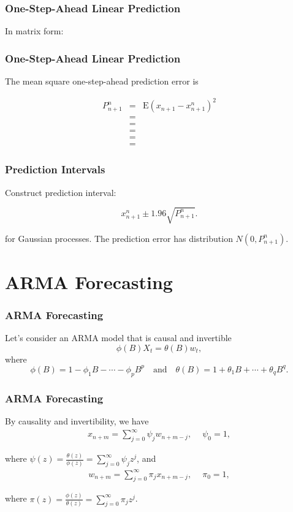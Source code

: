 \documentclass[%
xcolor=pdftex]{beamer}
\begin{document}
\begin{frame}
\frametitle{One-Step-Ahead Linear Prediction}

In matrix form:

\vspace{70mm}

\end{frame}


\begin{frame}
\frametitle{One-Step-Ahead Linear Prediction}

The mean square one-step-ahead prediction error is

\begin{eqnarray}
P_{n+1}^n &=& \mbox{E}(x_{n+1} - x_{n+1}^n)^2 \nonumber \\
          &=& \nonumber \\
          &=& \nonumber \\
          &=& \nonumber \\
          &=& \nonumber \\
          &=&
\end{eqnarray}
\end{frame}

\begin{frame}
\frametitle{Prediction Intervals}

Construct prediction interval:

$$
x_{n+1}^n \pm 1.96 \sqrt{P_{n+1}^n}.
$$


for Gaussian processes. The prediction error has distribution $N(0,P_{n+1}^n)$.

\end{frame}


\section{ARMA Forecasting}
\frame{\tableofcontents[currentsection]}

\begin{frame}
\frametitle{ARMA Forecasting}

Let's consider an ARMA model that is causal and invertible
$$
\phi(B)  X_t = \theta(B) w_t,
$$
where
$$
\phi(B) = 1-\phi_1 B - \cdots - \phi_p B^p \quad
\mbox{and} \quad
\theta(B) = 1+\theta_1 B + \cdots+\theta_q B^q.
$$
\end{frame}

\begin{frame}
\frametitle{ARMA Forecasting}

By causality and invertibility, we have
\begin{eqnarray}\label{eq:1}
 x_{n+m}=\sum_{j=0}^\infty \psi_j w_{n+m-j},\quad \ \psi_0=1,
\end{eqnarray}

where $\psi(z) = \frac{\theta(z)}{\phi(z)} = \sum^\infty_{j=0} \psi_j z^j$,  and
 \begin{eqnarray}\label{eq:2}
 w_{n+m}=\sum_{j=0}^\infty \pi_j x_{n+m-j}, \quad \ \pi_0=1,
\end{eqnarray}

where $\pi(z) = \frac{\phi(z)}{\theta(z)} = \sum^\infty_{j=0} \pi_j z^j$.
\end{frame}
\end{document}
